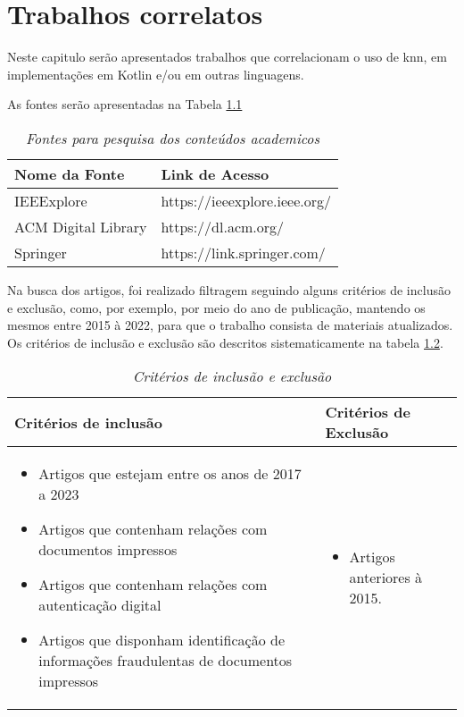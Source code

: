\chapter{Trabalhos correlatos}

Neste capitulo serão apresentados trabalhos que correlacionam o uso de \acrshort{knn}, em implementações em Kotlin e/ou em outras linguagens.

As fontes serão apresentadas na Tabela \ref{table:fontes}

\begin{table}[h]
    \centering
    \begin{tabular}{|m{4cm}|m{4cm}|} \hline
       Nome da Fonte       & Link de Acesso                    \\ \hline
       
       IEEExplore          & https://ieeexplore.ieee.org/      \\ \hline
       ACM Digital Library & https://dl.acm.org/               \\ \hline
       Springer            & https://link.springer.com/        \\ \hline
    \end{tabular}
    \caption[Fontes de pesquisa]{\textit{Fontes para pesquisa dos conteúdos academicos}}
    \label{table:fontes}
\end{table}

Na busca dos artigos, foi realizado filtragem seguindo alguns critérios de inclusão e exclusão, como, por exemplo, por meio do ano de publicação, mantendo os mesmos entre 2015 à 2022, para que o trabalho consista de materiais atualizados. Os critérios de inclusão e exclusão são descritos sistematicamente na tabela \ref{table:criterios}.
\newpage
\begin{table}[h]
    \centering
    \begin{tabular}{|m{4cm}|m{4cm}|} \hline
    Critérios de inclusão & Critérios de Exclusão \\ \hline
    \begin{itemize}[leftmargin=10px]
        \item Artigos que estejam entre os anos de 2017 a 2023
        \item Artigos que contenham relações com documentos impressos
        \item Artigos que contenham relações com autenticação digital
        \item Artigos que disponham identificação de informações fraudulentas de documentos impressos
    \end{itemize} &
    \begin{itemize}[leftmargin=10px]
        \item Artigos anteriores à 2015.
    \end{itemize}\\ \hline
    \end{tabular} 
    \caption[Critérios de inclusão e exclusão]{\textit{Critérios de inclusão e exclusão}}
    \label{table:criterios}
\end{table}
    

